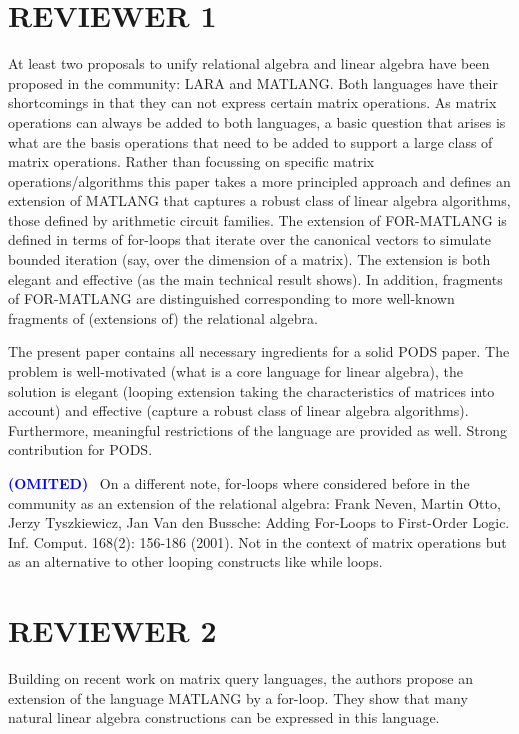 \documentclass[a4paper]{article}
\newcommand{\OMIT}{\textcolor{blue}{\textbf{(OMITED)}} \ }
\begin{document}
	
\section*{REVIEWER 1}
    
At least two proposals to unify relational algebra and linear algebra have been proposed in the community: LARA and MATLANG.
Both languages have their shortcomings in that they can not express certain matrix operations. As matrix operations can always be 
added to both languages, a basic question that arises is what are the basis operations that need to be added to support a large 
class of matrix operations.  Rather than focussing on specific matrix operations/algorithms this paper takes a more principled 
approach and defines an extension of MATLANG that captures a robust class of linear algebra algorithms, those defined by arithmetic 
circuit families. The extension of FOR-MATLANG is defined in terms of for-loops that iterate over the canonical vectors to simulate 
bounded iteration (say, over the dimension of a matrix). The extension is both elegant and effective (as the main technical result 
shows). In addition, fragments of FOR-MATLANG are distinguished corresponding to more well-known fragments of (extensions of) the 
relational algebra.

The present paper contains all necessary ingredients for a solid PODS paper. The problem is well-motivated (what is a 
core language for linear algebra), the solution is elegant (looping extension taking the characteristics of matrices into 
account) and effective (capture a robust class of linear algebra algorithms). Furthermore, meaningful restrictions of the 
language are provided as well. Strong contribution for PODS.

\OMIT On a different note, for-loops where considered before in the community as an extension of the relational algebra: 
Frank Neven, Martin Otto, Jerzy Tyszkiewicz, Jan Van den Bussche: 
Adding For-Loops to First-Order Logic. Inf. Comput. 168(2): 156-186 (2001). Not in the context of matrix operations but 
as an alternative to other looping constructs like while loops.


\newpage

\section*{REVIEWER 2}

Building on recent work on matrix query languages, the authors
propose an extension of the language MATLANG by a for-loop. They show
that many natural linear algebra constructions can be expressed in
this language.
\end{document}
